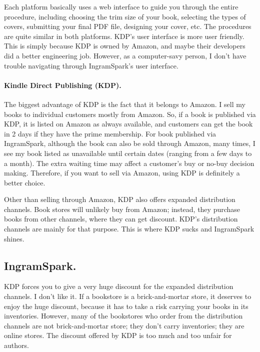 Each platform basically uses a web interface to guide you through the entire procedure,
including choosing the trim size of your book, selecting the types of covers, submitting your
final PDF file, designing your cover, etc. The procedures are quite similar in both platforms. 
KDP's user interface is more user friendly. This is simply because KDP is owned by Amazon, and
maybe their developers did a better engineering job. However, as a computer-savy person, I 
don't have trouble navigating through IngramSpark's user interface.


\paragraph{Kindle Direct Publishing (KDP).}
The biggest advantage of KDP is the fact that it belongs to Amazon. I sell my books to
individual customers mostly from Amazon. So, if a book is published via KDP, it is listed on
Amazon as always available, and customers can get the book in 2 days if they have the prime
membership.  For book published via IngramSpark, although the book can also be
sold through Amazon, many times, I see my book listed as unavailable until certain dates
(ranging from a few days to a month). The extra waiting time may affect a customer's buy or
no-buy decision making.  
Therefore, if you want to sell via Amazon, using KDP is definitely a better choice. 


Other than selling through Amazon, KDP also offers expanded distribution channels. Book stores
will unlikely buy from Amazon; instead, they purchase books from other channels, where they can
get discount. KDP's distribution channels are mainly for that purpose. 
This is where KDP sucks and IngramSpark shines. 


\subsection{IngramSpark.} 
KDP forces you to give a very huge discount for the expanded distribution channels. I don't
like it. If a bookstore is a brick-and-mortar store, it deserves to enjoy the huge discount,
because it has to take a risk carrying your books in its inventories. However, many of the
bookstores who order from the distribution channels are not brick-and-mortar store; they
don't carry inventories; they are online stores. The discount offered by KDP is too much and
too unfair for authors. 



